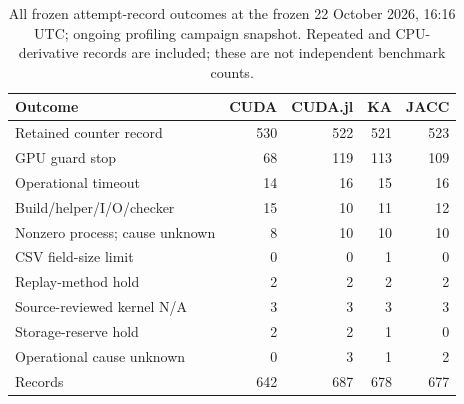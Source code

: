 \begin{table}[t]
\centering\small
\caption{All frozen attempt-record outcomes at the frozen 22 October 2026, 16:16 UTC; ongoing profiling campaign snapshot. Repeated and CPU-derivative records are included; these are not independent benchmark counts.}
\label{tab:roofline-failures-all-frozen-attempts}
\begin{tabular}{lrrrr}
\toprule
Outcome & CUDA & CUDA.jl & KA & JACC \\
\midrule
Retained counter record & 530 & 522 & 521 & 523 \\
GPU guard stop & 68 & 119 & 113 & 109 \\
Operational timeout & 14 & 16 & 15 & 16 \\
Build/helper/I/O/checker & 15 & 10 & 11 & 12 \\
Nonzero process; cause unknown & 8 & 10 & 10 & 10 \\
CSV field-size limit & 0 & 0 & 1 & 0 \\
Replay-method hold & 2 & 2 & 2 & 2 \\
Source-reviewed kernel N/A & 3 & 3 & 3 & 3 \\
Storage-reserve hold & 2 & 2 & 1 & 0 \\
Operational cause unknown & 0 & 3 & 1 & 2 \\
\midrule
Records & 642 & 687 & 678 & 677 \\
\bottomrule
\end{tabular}
\end{table}
